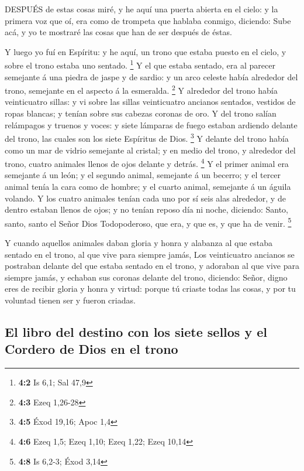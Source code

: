  DESPUÉS de estas cosas miré, y he aquí una puerta abierta
en el cielo: y la primera voz que oí, era como de trompeta que hablaba
conmigo, diciendo: Sube acá, y yo te mostraré las cosas que han de ser
después de éstas.

 Y luego yo fuí en Espíritu: y he aquí, un trono que estaba
puesto en el cielo, y sobre el trono estaba uno sentado. \footnote{\textbf{4:2}
  Is 6,1; Sal 47,9}  Y el que estaba sentado, era al parecer
semejante á una piedra de jaspe y de sardio: y un arco celeste había
alrededor del trono, semejante en el aspecto á la esmeralda. \footnote{\textbf{4:3}
  Ezeq 1,26-28}  Y alrededor del trono había veinticuatro
sillas: y vi sobre las sillas veinticuatro ancianos sentados, vestidos
de ropas blancas; y tenían sobre sus cabezas coronas de oro.
 Y del trono salían relámpagos y truenos y voces: y siete
lámparas de fuego estaban ardiendo delante del trono, las cuales son los
siete Espíritus de Dios. \footnote{\textbf{4:5} Éxod 19,16; Apoc 1,4}
 Y delante del trono había como un mar de vidrio semejante
al cristal; y en medio del trono, y alrededor del trono, cuatro animales
llenos de ojos delante y detrás. \footnote{\textbf{4:6} Ezeq 1,5; Ezeq
  1,10; Ezeq 1,22; Ezeq 10,14}  Y el primer animal era
semejante á un león; y el segundo animal, semejante á un becerro; y el
tercer animal tenía la cara como de hombre; y el cuarto animal,
semejante á un águila volando.  Y los cuatro animales tenían
cada uno por sí seis alas alrededor, y de dentro estaban llenos de ojos;
y no tenían reposo día ni noche, diciendo: Santo, santo, santo el Señor
Dios Todopoderoso, que era, y que es, y que ha de venir. \footnote{\textbf{4:8}
  Is 6,2-3; Éxod 3,14}

 Y cuando aquellos animales daban gloria y honra y alabanza
al que estaba sentado en el trono, al que vive para siempre jamás,
 Los veinticuatro ancianos se postraban delante del que
estaba sentado en el trono, y adoraban al que vive para siempre jamás, y
echaban sus coronas delante del trono, diciendo:  Señor,
digno eres de recibir gloria y honra y virtud: porque tú criaste todas
las cosas, y por tu voluntad tienen ser y fueron criadas.

\hypertarget{el-libro-del-destino-con-los-siete-sellos-y-el-cordero-de-dios-en-el-trono}{%
\subsection{El libro del destino con los siete sellos y el Cordero de
Dios en el
trono}\label{el-libro-del-destino-con-los-siete-sellos-y-el-cordero-de-dios-en-el-trono}}

